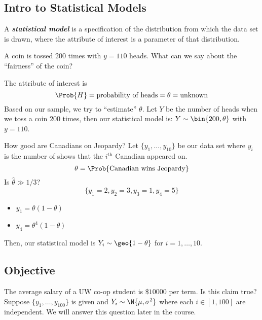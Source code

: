 \subsection*{Intro to Statistical Models}
\begin{Definition}{}{}
    A \textbf{\emph{statistical model}} is a specification of the
    distribution from which the data set is drawn, where the attribute of interest
    is a parameter of that distribution.
\end{Definition}
\begin{Example}{}{}
    A coin is tossed $ 200 $ times with $ y=110 $ heads. What can we say
    about the ``fairness'' of the coin?

    The attribute of interest is
    \[ \Prob{H}=\text{probability of heads}=\theta=\text{unknown} \]
    Based on our sample, we try to ``estimate'' $ \theta $.
    Let $ Y $ be the number of heads when we toss a coin $ 200 $ times,
    then our statistical model is: $ Y \sim \bin{200,\theta} $
    with $ y=110 $.
\end{Example}



\begin{Example}{}{}
    How good are Canadians on Jeopardy? Let $ \{y_1,\ldots ,y_{10}\} $
    be our data set where $ y_i $ is the number of shows that the
    $ i^{\text{th}} $ Canadian appeared on.
    \[ \theta=\Prob{\text{Canadian wins Jeopardy}} \]
    Is $ \hat{\theta}\gg 1/3 $?
    \[ \{y_1=2,y_2=3,y_3=1,y_4=5\} \]
    \begin{itemize}
        \item $ y_1=\theta(1-\theta) $
        \item $ y_4=\theta^4(1-\theta) $
    \end{itemize}
    Then, our statistical model is $ Y_i \sim \geo{1-\theta} $
    for $ i=1,\ldots ,10 $.
\end{Example}

\subsection*{Objective}
The average salary of a UW co-op student is $ \$10000 $ per term.
Is this claim true? Suppose $ \{y_1,\ldots ,y_{100}\} $ is given and
$ Y_i \sim \N{\mu,\sigma^2} $
where each $ i\in[1,100] $ are independent. We will answer this question later in the course.
